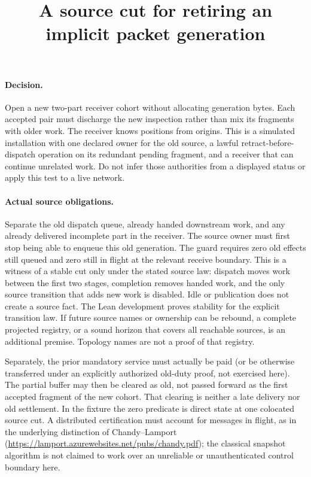 \documentclass{article}
\title{A source cut for retiring an implicit packet generation}
\author{}\date{}
\begin{document}
\maketitle

\paragraph{Decision.}
Open a new two-part receiver cohort without allocating generation bytes.
Each accepted pair must discharge the new inspection rather than mix its
fragments with older work. The receiver knows positions from origins.
This is a simulated installation with one declared owner for the old
source, a lawful retract-before-dispatch operation on its redundant
pending fragment, and a receiver that can continue unrelated work.
Do not infer those authorities from a displayed status or apply this
test to a live network.

\paragraph{Actual source obligations.}
Separate the old dispatch queue, already handed downstream work, and
any already delivered incomplete part in the receiver. The source owner
must first stop being able to enqueue this old generation. The guard
requires zero old effects still queued and zero still in flight at the
relevant receive boundary. This is a witness of a stable cut only under
the stated source law: dispatch moves work between the first two stages,
completion removes handed work, and the only source transition that adds
new work is disabled. Idle or publication does not create a source fact.
The Lean development proves stability for the explicit transition law.
If future source names or ownership can be rebound, a complete projected
registry, or a sound horizon that covers all reachable sources, is an
additional premise. Topology names are not a proof of that registry.

Separately, the prior mandatory service must actually be paid (or be
otherwise transferred under an explicitly authorized old-duty proof,
not exercised here). The partial buffer may then be cleared as old,
not passed forward as the first accepted fragment of the new cohort.
That clearing is neither a late delivery nor old settlement. In the
fixture the zero predicate is direct state at one colocated source
cut. A distributed certification must account for messages in flight,
as in the underlying distinction of Chandy--Lamport
(\url{https://lamport.azurewebsites.net/pubs/chandy.pdf});
the classical snapshot algorithm is not claimed to work over an
unreliable or unauthenticated control boundary here.
\end{document}
